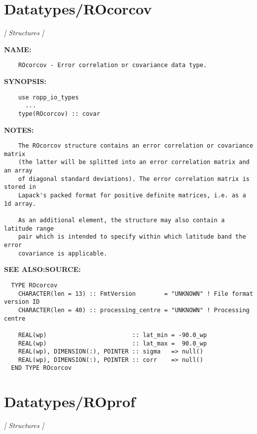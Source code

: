 \section{Datatypes/ROcorcov}
\textsl{[ Structures ]}

\label{ch:robo51}
\label{ch:Datatypes_ROcorcov}
\textbf{NAME:}\hspace{0.08in}\begin{Verbatim}
    ROcorcov - Error correlation or covariance data type.
\end{Verbatim}
\textbf{SYNOPSIS:}\hspace{0.08in}\begin{Verbatim}
    use ropp_io_types
      ...
    type(ROcorcov) :: covar
\end{Verbatim}
\textbf{NOTES:}\hspace{0.08in}\begin{Verbatim}
    The ROcorcov structure contains an error correlation or covariance matrix
    (the latter will be splitted into an error correlation matrix and an array
    of diagonal standard deviations). The error correlation matrix is stored in
    Lapack's packed format for positive definite matrices, i.e. as a 1d array.

    As an additional element, the structure may also contain a latitude range
    pair which is intended to specify within which latitude band the error
    covariance is applicable.
\end{Verbatim}
\textbf{SEE ALSO:}\hspace{0.08in}\textbf{SOURCE:}\hspace{0.08in}\begin{Verbatim}
  TYPE ROcorcov
    CHARACTER(len = 13) :: FmtVersion        = "UNKNOWN" ! File format version ID
    CHARACTER(len = 40) :: processing_centre = "UNKNOWN" ! Processing centre

    REAL(wp)                        :: lat_min = -90.0_wp
    REAL(wp)                        :: lat_max =  90.0_wp
    REAL(wp), DIMENSION(:), POINTER :: sigma   => null()
    REAL(wp), DIMENSION(:), POINTER :: corr    => null()
  END TYPE ROcorcov
\end{Verbatim}
\section{Datatypes/ROprof}
\textsl{[ Structures ]}

